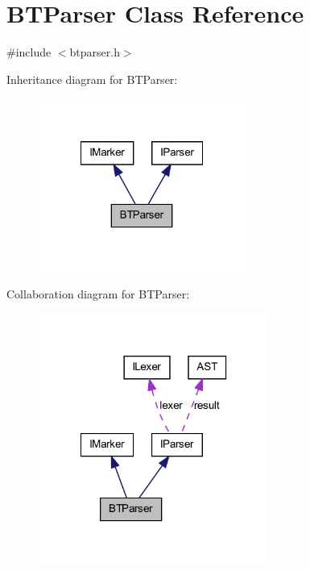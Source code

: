 \hypertarget{class_b_t_parser}{
\section{BTParser Class Reference}
\label{class_b_t_parser}
}


{\ttfamily \#include $<$btparser.h$>$}



Inheritance diagram for BTParser:\nopagebreak
\begin{figure}[H]
\begin{center}
\leavevmode
\includegraphics[width=192pt]{class_b_t_parser__inherit__graph}
\end{center}
\end{figure}


Collaboration diagram for BTParser:\nopagebreak
\begin{figure}[H]
\begin{center}
\leavevmode
\includegraphics[width=214pt]{class_b_t_parser__coll__graph}
\end{center}
\end{figure}
